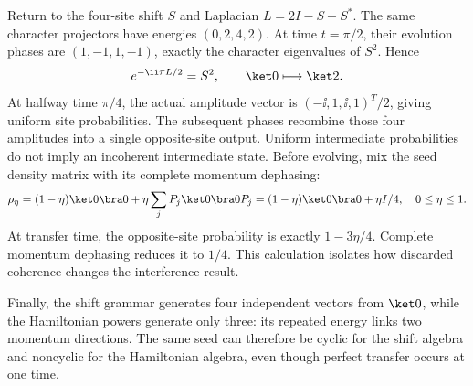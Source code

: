 Return to the four-site shift $S$ and Laplacian $L=2I-S-S^*$. The same character projectors have energies $(0,2,4,2)$. At time $t=\pi/2$, their evolution phases are $(1,-1,1,-1)$, exactly the character eigenvalues of $S^2$. Hence
\[
e^{-\ii\pi L/2}=S^2,\qquad
\ket0\longmapsto\ket2.
\]
At halfway time $\pi/4$, the actual amplitude vector is $(-\ii,1,\ii,1)^T/2$, giving uniform site probabilities. The subsequent phases recombine those four amplitudes into a single opposite-site output. Uniform intermediate probabilities do not imply an incoherent intermediate state.
Before evolving, mix the seed density matrix with its complete momentum dephasing:
\[
\rho_\eta=(1-\eta)\ket0\bra0+\eta\sum_jP_j\ket0\bra0P_j
=(1-\eta)\ket0\bra0+\eta I/4,
\quad0\le\eta\le1.
\]
At transfer time, the opposite-site probability is exactly $1-3\eta/4$. Complete momentum dephasing reduces it to $1/4$. This calculation isolates how discarded coherence changes the interference result.

Finally, the shift grammar generates four independent vectors from $\ket0$, while the Hamiltonian powers generate only three: its repeated energy links two momentum directions. The same seed can therefore be cyclic for the shift algebra and noncyclic for the Hamiltonian algebra, even though perfect transfer occurs at one time.

